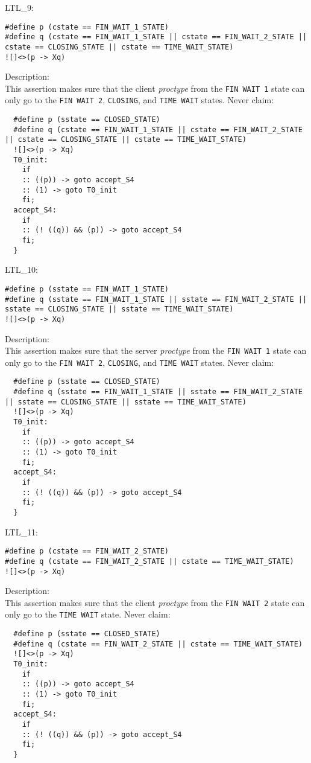\documentclass{WigReport}
\begin{document}
LTL\_9:\\
\begin{verbatim}
#define p (cstate == FIN_WAIT_1_STATE)
#define q (cstate == FIN_WAIT_1_STATE || cstate == FIN_WAIT_2_STATE || cstate == CLOSING_STATE || cstate == TIME_WAIT_STATE)
![]<>(p -> Xq)
\end{verbatim}
Description:\\
This assertion makes sure that the client \textit{proctype} from the \verb|FIN WAIT 1| state can only go to the \verb|FIN WAIT 2|, \verb|CLOSING|, and \verb|TIME WAIT| states.
Never claim:\\
\begin{verbatim}
  #define p (sstate == CLOSED_STATE)
  #define q (cstate == FIN_WAIT_1_STATE || cstate == FIN_WAIT_2_STATE || cstate == CLOSING_STATE || cstate == TIME_WAIT_STATE)
  ![]<>(p -> Xq)
  T0_init:
    if
    :: ((p)) -> goto accept_S4
    :: (1) -> goto T0_init
    fi;
  accept_S4:
    if
    :: (! ((q)) && (p)) -> goto accept_S4
    fi;
  }
\end{verbatim}


LTL\_10:\\
\begin{verbatim}
#define p (sstate == FIN_WAIT_1_STATE)
#define q (sstate == FIN_WAIT_1_STATE || sstate == FIN_WAIT_2_STATE || sstate == CLOSING_STATE || sstate == TIME_WAIT_STATE)
![]<>(p -> Xq)
\end{verbatim}
Description:\\
This assertion makes sure that the server \textit{proctype} from the \verb|FIN WAIT 1| state can only go to the \verb|FIN WAIT 2|, \verb|CLOSING|, and \verb|TIME WAIT| states.
Never claim:\\
\begin{verbatim}
  #define p (sstate == CLOSED_STATE)
  #define q (sstate == FIN_WAIT_1_STATE || sstate == FIN_WAIT_2_STATE || sstate == CLOSING_STATE || sstate == TIME_WAIT_STATE)
  ![]<>(p -> Xq)
  T0_init:
    if
    :: ((p)) -> goto accept_S4
    :: (1) -> goto T0_init
    fi;
  accept_S4:
    if
    :: (! ((q)) && (p)) -> goto accept_S4
    fi;
  }
\end{verbatim}


LTL\_11:\\
\begin{verbatim}
#define p (cstate == FIN_WAIT_2_STATE)
#define q (cstate == FIN_WAIT_2_STATE || cstate == TIME_WAIT_STATE)
![]<>(p -> Xq)
\end{verbatim}
Description:\\
This assertion makes sure that the client \textit{proctype} from the \verb|FIN WAIT 2| state can only go to the \verb|TIME WAIT| state.
Never claim:\\
\begin{verbatim}
  #define p (sstate == CLOSED_STATE)
  #define q (cstate == FIN_WAIT_2_STATE || cstate == TIME_WAIT_STATE)
  ![]<>(p -> Xq)
  T0_init:
    if
    :: ((p)) -> goto accept_S4
    :: (1) -> goto T0_init
    fi;
  accept_S4:
    if
    :: (! ((q)) && (p)) -> goto accept_S4
    fi;
  }
\end{verbatim}
\end{document}

